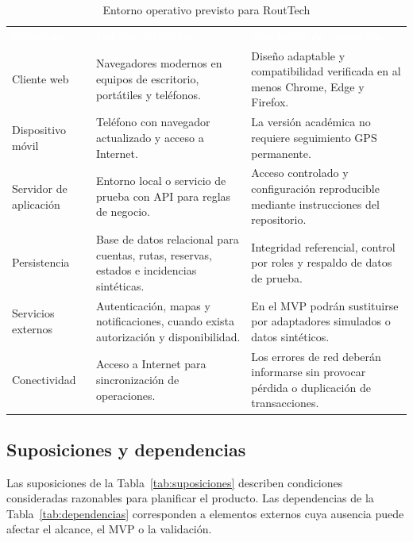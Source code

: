 \documentclass[12pt,a4paper]{article}
\begin{document}
\begin{table}[H]
\centering
\caption{Entorno operativo previsto para RoutTech}
\label{tab:entorno-operativo}
\small
{}
\begin{tabularx}{\textwidth}{L{3.0cm} Y L{4.0cm}}
\textcolor{white}{\textbf{Elemento}} &
\textcolor{white}{\textbf{Entorno previsto}} &
\textcolor{white}{\textbf{Condición de operación}}\\
Cliente web & Navegadores modernos en equipos de escritorio, portátiles y teléfonos. & Diseño adaptable y compatibilidad verificada en al menos Chrome, Edge y Firefox.\\
Dispositivo móvil & Teléfono con navegador actualizado y acceso a Internet. & La versión académica no requiere seguimiento GPS permanente.\\
Servidor de aplicación & Entorno local o servicio de prueba con API para reglas de negocio. & Acceso controlado y configuración reproducible mediante instrucciones del repositorio.\\
Persistencia & Base de datos relacional para cuentas, rutas, reservas, estados e incidencias sintéticas. & Integridad referencial, control por roles y respaldo de datos de prueba.\\
Servicios externos & Autenticación, mapas y notificaciones, cuando exista autorización y disponibilidad. & En el MVP podrán sustituirse por adaptadores simulados o datos sintéticos.\\
Conectividad & Acceso a Internet para sincronización de operaciones. & Los errores de red deberán informarse sin provocar pérdida o duplicación de transacciones.\\
\end{tabularx}
\end{table}

\subsection{Suposiciones y dependencias}

Las suposiciones de la Tabla~\ref{tab:suposiciones} describen condiciones consideradas razonables para planificar el producto. Las dependencias de la Tabla~\ref{tab:dependencias} corresponden a elementos externos cuya ausencia puede afectar el alcance, el MVP o la validación.
\end{document}
